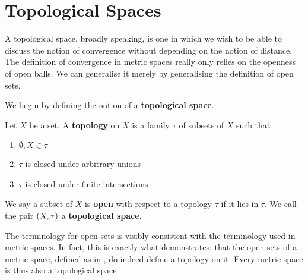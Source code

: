 \section{Topological Spaces}

A topological space, broadly speaking, is one in which we wish to be able to discuss the notion of convergence without depending on the notion of distance. The definition of convergence in metric spaces really only relies on the openness of open balls. We can generalise it merely by generalising the definition of open sets.

We begin by defining the notion of a \textbf{topological space}.

\begin{boxdefinition}
    Let $X$ be a set. A \textbf{topology} on $X$ is a family $\tau$ of subsets of $X$ such that
    \begin{enumerate}
        \item $\emptyset, X \in \tau$
        \item $\tau$ is closed under arbitrary unions
        \item $\tau$ is closed under finite intersections
    \end{enumerate}
    We say a subset of $X$ is \textbf{open} with respect to a topology $\tau$ if it lies in $\tau$. We call the pair $\left( X, \tau \right)$ a \textbf{topological space}.
\end{boxdefinition}

The terminology for open sets is visibly consistent with the terminology used in metric spaces. In fact, this is exactly what  demonstrates: that the open sets of a metric space, defined as in , do indeed define a topology on it. Every metric space is thus also a topological space.